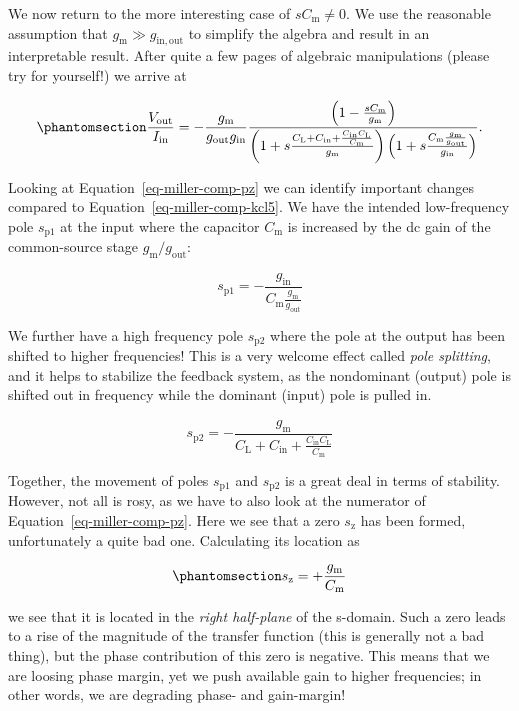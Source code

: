 \documentclass[
  a4paper,
  DIV=11,
  numbers=noendperiod]{scrartcl}
\begin{document}
We now return to the more interesting case of \(s C_\mathrm{m} \neq 0\).
We use the reasonable assumption that
\(g_\mathrm{m}\gg g_\mathrm{in,out}\) to simplify the algebra and result
in an interpretable result. After quite a few pages of algebraic
manipulations (please try for yourself!) we arrive at

\begin{equation}\phantomsection\label{eq-miller-comp-pz}{
\frac{V_\mathrm{out}}{I_\mathrm{in}} = -\frac{g_\mathrm{m}}{g_\mathrm{out} g_\mathrm{in}}
\frac{\left( 1 - \frac{s C_\mathrm{m}}{g_\mathrm{m}} \right)}
{
\left( 1 + s \frac{C_\mathrm{L} + C_\mathrm{in} + \frac{C_\mathrm{in} C_\mathrm{L}}{C_\mathrm{m}}}{g_\mathrm{m}} \right)
\left( 1 + s \frac{C_\mathrm{m} \frac{g_\mathrm{m}}{g_\mathrm{out}}}{g_\mathrm{in}} \right)
}.
}\end{equation}

Looking at Equation~\ref{eq-miller-comp-pz} we can identify important
changes compared to Equation~\ref{eq-miller-comp-kcl5}. We have the
intended low-frequency pole \(s_\mathrm{p1}\) at the input where the
capacitor \(C_\mathrm{m}\) is increased by the dc gain of the
common-source stage \(g_\mathrm{m}/ g_\mathrm{out}\):

\[
s_\mathrm{p1} = -\frac{g_\mathrm{in}}{C_\mathrm{m} \frac{g_\mathrm{m}}{g_\mathrm{out}}}
\]

We further have a high frequency pole \(s_\mathrm{p2}\) where the pole
at the output has been shifted to higher frequencies! This is a very
welcome effect called \emph{pole splitting}, and it helps to stabilize
the feedback system, as the nondominant (output) pole is shifted out in
frequency while the dominant (input) pole is pulled in.

\[
s_\mathrm{p2} = -\frac{g_\mathrm{m}}{C_\mathrm{L} + C_\mathrm{in} + \frac{C_\mathrm{in} C_\mathrm{L}}{C_\mathrm{m}}}
\]

Together, the movement of poles \(s_\mathrm{p1}\) and \(s_\mathrm{p2}\)
is a great deal in terms of stability. However, not all is rosy, as we
have to also look at the numerator of Equation~\ref{eq-miller-comp-pz}.
Here we see that a zero \(s_\mathrm{z}\) has been formed, unfortunately
a quite bad one. Calculating its location as

\begin{equation}\phantomsection\label{eq-miller-zero}{
s_\mathrm{z} = +\frac{g_\mathrm{m}}{C_\mathrm{m}}
}\end{equation}

we see that it is located in the \emph{right half-plane} of the
s-domain. Such a zero leads to a rise of the magnitude of the transfer
function (this is generally not a bad thing), but the phase contribution
of this zero is negative. This means that we are loosing phase margin,
yet we push available gain to higher frequencies; in other words, we are
degrading phase- and gain-margin!
\end{document}
